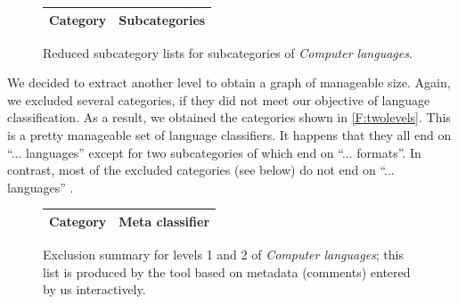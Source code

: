 
\begin{figure}[t!]
{\footnotesize

\begin{center}
\noindent
\begin{tabular}{l|p{3.4in}}
\textbf{Category} & \textbf{Subcategories} \\\hline

\end{tabular}
\end{center}

\vspace{-42\in}

}
\caption{Reduced subcategory lists for subcategories of \emph{Computer languages}.}
\label{F:twolevels}
\vspace{-42\in}
\end{figure}


We decided to extract another level to obtain a graph of manageable size. Again, we excluded several categories, if they did not meet our objective of language classification. As a result, we obtained the categories shown in \autoref{F:twolevels}. This is a pretty manageable set of language classifiers. It happens that they all end on ``... languages'' except for two subcategories of  which end on ``... formats''. In contrast, most of the excluded categories (see below) do not end on ``... languages'' .


\begin{figure}[t!]
{\footnotesize

\begin{center}
\noindent
\begin{tabular}{l|l}
\textbf{Category} & \textbf{Meta classifier} \\\hline

\end{tabular}
\end{center}

\vspace{-42\in}

}
\caption{Exclusion summary for levels 1 and 2 of \emph{Computer languages}; this list is produced by the \WikiTax{} tool based on metadata (comments) entered by us interactively.}
\label{F:metaclassify}
\vspace{-42\in}
\end{figure}

